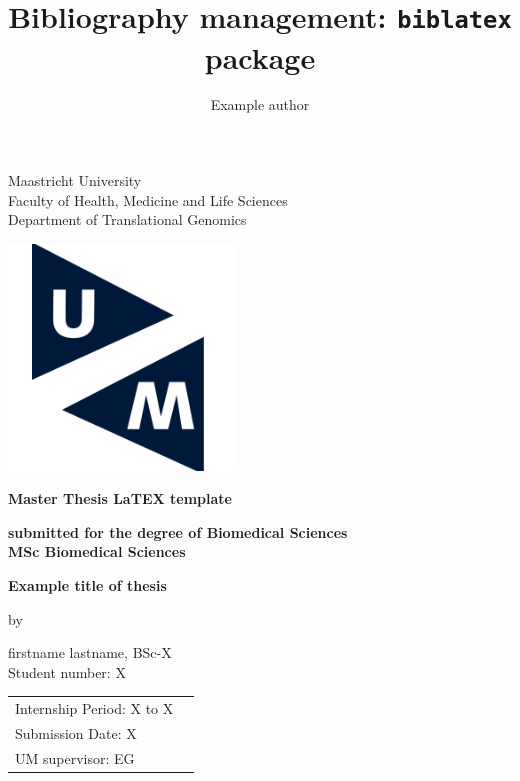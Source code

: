 \documentclass[11pt]{article}
\author{Example author}
\title{Bibliography management: \texttt{biblatex} package}
\begin{document}
\thispagestyle{empty}

\begin{center}
\thispagestyle{empty}


\sffamily
\LARGE{Maastricht University}\\[-0.9ex]
\LARGE{Faculty of Health, Medicine and Life Sciences}\\[2ex]
\large{Department of Translational Genomics}\\
\vspace{0.4cm}

\includegraphics[width=6cm]{Image frontpage/um_logo_maastricht_university_logo_universiteit_maastricht_logo_copy.png}\\
\vspace{0.6cm}

\textbf{\LARGE{Master Thesis LaTEX template}}
\medskip\par
\textbf{\normalsize{submitted for the degree of Biomedical Sciences}} \\[2ex]
\textbf{\Large{MSc Biomedical Sciences}}\\
\vspace{0.6cm}

\Large{\textbf{Example title of thesis}}\\[-2.0ex]

\bigskip\par
by \par
\large{firstname lastname, BSc-X }\\[-1ex]
\large{Student number: X}\\ [-1.5ex]

\vspace{0.6cm}
\end{center}
\vfill
\medskip
\vfill
\begin{tabular}{ll}
\sffamily
  Internship Period: X to X \\
\sffamily
  Submission Date: X \\[-1ex]
\sffamily
  UM supervisor: \ac{EG} \\
\end{tabular}
\vfill
\end{document}
